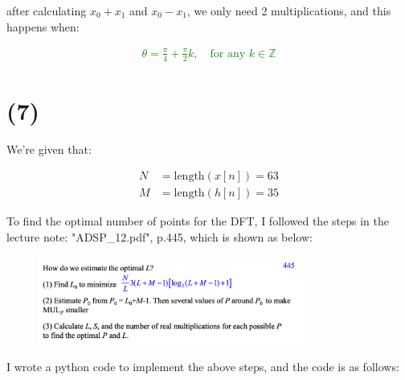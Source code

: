 \documentclass{article}
\begin{document}
after calculating $x_0 + x_1$ and $x_0 - x_1$, 
we only need 2 multiplications, and this happens when:

\textcolor{Green}{
\begin{align*}
    \theta = \frac{\pi}{4} + \frac{\pi}{2} k, \quad \text{for any } k \in \mathbb{Z}
\end{align*}
}

\section*{(7)}

We're given that:

\begin{align*}
    N &= \text{length}(x[n]) = 63 \\
    M &= \text{length}(h[n]) = 35
\end{align*}





To find the optimal number of points for the DFT, I followed the steps in the lecture note: "ADSP\_12.pdf", p.445,
which is shown as below:

\begin{figure}[H]
    \centering
    \includegraphics[width=0.8\textwidth]{HW4_img/7_process.png}
\end{figure}

\bigskip

I wrote a python code to implement the above steps, and the code is as follows:
\end{document}
